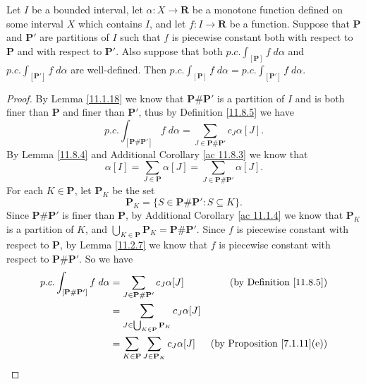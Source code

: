 \begin{additional corollary}\label{ac 11.8.4}
Let \(I\) be a bounded interval, let \(\alpha : X \to \mathbf{R}\) be a monotone function defined on some interval \(X\) which contains \(I\), and let \(f : I \to \mathbf{R}\) be a function.
Suppose that \(\mathbf{P}\) and \(\mathbf{P}'\) are partitions of \(I\) such that \(f\) is piecewise constant both with respect to \(\mathbf{P}\) and with respect to \(\mathbf{P}'\).
Also suppose that both \(p.c. \int_{[\mathbf{P}]} f \; d \alpha\) and \(p.c. \int_{[\mathbf{P}']} f \; d \alpha\) are well-defined.
Then \(p.c. \int_{[\mathbf{P}]} f \; d \alpha = p.c. \int_{[\mathbf{P}']} f \; d \alpha\).
\end{additional corollary}

\begin{proof}
    By Lemma \ref{11.1.18} we know that \(\mathbf{P} \# \mathbf{P}'\) is a partition of \(I\) and is both finer than \(\mathbf{P}\) and finer than \(\mathbf{P}'\), thus by Definition \ref{11.8.5} we have
    \[
        p.c. \int_{[\mathbf{P} \# \mathbf{P}']} f \; d \alpha = \sum_{J \in \mathbf{P} \# \mathbf{P}'} c_J \alpha[J].
    \]
    By Lemma \ref{11.8.4} and Additional Corollary \ref{ac 11.8.3} we know that
    \[
        \alpha[I] = \sum_{J \in \mathbf{P}} \alpha[J] = \sum_{J \in \mathbf{P} \# \mathbf{P}'} \alpha[J].
    \]
    For each \(K \in \mathbf{P}\), let \(\mathbf{P}_K\) be the set
    \[
        \mathbf{P}_K = \{S \in \mathbf{P} \# \mathbf{P}' : S \subseteq K\}.
    \]
    Since \(\mathbf{P} \# \mathbf{P}'\) is finer than \(\mathbf{P}\), by Additional Corollary \ref{ac 11.1.4} we know that \(\mathbf{P}_K\) is a partition of \(K\), and \(\bigcup_{K \in \mathbf{P}} \mathbf{P}_K = \mathbf{P} \# \mathbf{P}'\).
    Since \(f\) is piecewise constant with respect to \(\mathbf{P}\), by Lemma \ref{11.2.7} we know that \(f\) is piecewise constant with respect to \(\mathbf{P} \# \mathbf{P}'\).
    So we have
    \begin{align*}
        p.c. \int_{[\mathbf{P} \# \mathbf{P}']} f \; d \alpha & = \sum_{J \in \mathbf{P} \# \mathbf{P}'} c_J \alpha[J]                        & \text{(by Definition \ref{11.8.5})}     \\
                                                              & = \sum_{J \in \bigcup_{K \in \mathbf{P}} \mathbf{P}_K} c_J \alpha[J]                                                    \\
                                                              & = \sum_{K \in \mathbf{P}} \sum_{J \in \mathbf{P}_K} c_J \alpha[J]             & \text{(by Proposition \ref{7.1.11}(e))} \\

\end{align*}
\end{proof}
